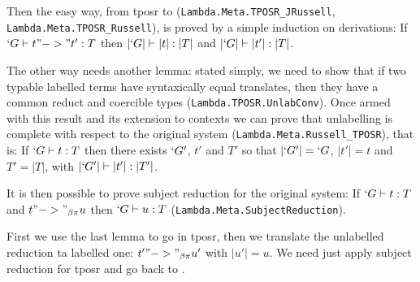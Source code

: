 \documentclass[11pt]{article}
\def\TPOSR{{\sc tposr}\xspace}
\def\coqmodule#1{\texttt{#1}}
\begin{document}
Then the easy way, from \TPOSR to \Russell
(\coqmodule{Lambda.Meta.TPOSR\_JRussell}, \coqmodule{Lambda.Meta.\-TPOSR\_Russell}), is proved by a simple induction
on derivations:
If $`G \vdash t "->" t' : T$ then $|`G| \vdash |t| : |T|$ and $|`G| \vdash |t'| : |T|$.

The other way needs another lemma: stated simply, we need to show
that if two typable labelled terms have syntaxically equal translates, then they
have a common reduct and coercible types
(\coqmodule{Lambda.TPOSR.UnlabConv}). Once armed with this result
and its extension to contexts we can prove that unlabelling is complete
with respect to the original system (\coqmodule{Lambda.Meta.Russell\_TPOSR}), that is:
If $`G \vdash t : T$ then there exists $`G'$, $t'$ and $T'$ so that
$|`G'| = `G$, $|t'| = t$ and $T' = |T|$, with $|`G'| \vdash |t'| : |T'|$.

It is then possible to prove subject reduction for the original system:
If $`G \vdash t : T$ and $t "->"_{\beta\pi} u$ then $`G \vdash u : T$ (\coqmodule{Lambda.Meta.SubjectReduction}).

First we use the last lemma to go in \TPOSR, then we translate the
unlabelled reduction ta labelled one: $t' "->"_{\beta\pi} u'$ with $|u'| = u$.
We need just apply subject reduction for \TPOSR and go back to \Russell.




\end{document}
